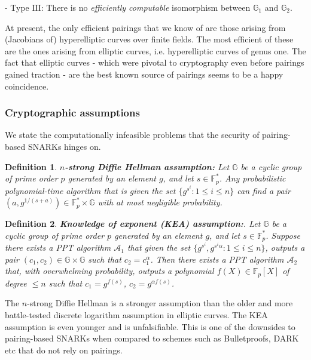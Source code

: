 \documentclass[11pt, lettersize, notitlepage, leqno, footskip=0.6cm]{article}
\newcommand{\bFp}{\mathbb{F}_p}
\newcommand{\mc}{\mathcal}
\newcommand{\mb}{\mathbb}
\newcommand{\mr}{\mathrm}
\newcommand{\al}{\alpha}
\newtheorem{Def}{Definition}[section]
\numberwithin{equation}{section}
\begin{document}
\noindent - Type $\mr{III}$: There is no \textit{efficiently computable} isomorphism between $\mb{G}_1$ and $\mb{G}_2$.

At present, the only efficient pairings that we know of are those arising from (Jacobians of) hyperelliptic curves over finite fields. The most efficient of these are the ones arising from elliptic curves, i.e. hyperelliptic curves of genus one. The fact that elliptic curves - which were pivotal to cryptography even before pairings gained traction - are the best known source of pairings seems to be a happy coincidence.



\subsubsection{\fontsize{11}{11}\selectfont Cryptographic assumptions}



We state the computationally infeasible problems that the security of pairing-based SNARKs hinges on.

\begin{Def} {\normalfont \textbf{{$n$-strong Diffie Hellman assumption:}}} Let $\mb{G}$ be a cyclic group of prime order $p$ generated by an element $g$, and let $s \in \bFp^*$. Any probabilistic polynomial-time algorithm that is given the set $\{g^{s^i}: 1\leq i\leq n \}$ can find a pair $(a, g^{1/(s+a)})\in \bFp^*\times \mb{G}$ with at most negligible probability.\end{Def}

\begin{Def} {\normalfont \textbf{{Knowledge of exponent (KEA) assumption:}}}. Let $\mb{G}$ be a cyclic group of prime order $p$ generated by an element $g$, and let $s \in \bFp^*$. Suppose there exists a PPT algorithm $\mc{A}_1$ that given the set $\{g^{s^i}, g^{s^i\al}: 1\leq i\leq n \}$, outputs a pair $(c_1, c_2)\in \mb{G}\times\mb{G}$ such that $c_2 = c_1^{\al}$. Then there exists a PPT algorithm $\mc{A}_2$ that, with overwhelming probability, outputs a polynomial $f(X)\in \bFp[X]$ of degree $\leq n$ such that $c_1 = g^{f(s)}$, $c_2 = g^{\al f(s)}$.\end{Def}

The $n$-strong Diffie Hellman is a stronger assumption than the older and more battle-tested discrete logarithm assumption in elliptic curves. The KEA assumption is even younger and is unfalsifiable. This is one of the downsides to pairing-based SNARKs when compared to schemes such as Bulletproofs, DARK etc that do not rely on pairings.
\end{document}

